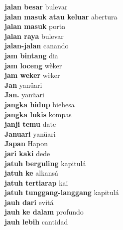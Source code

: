 \textbf{ jalan besar  } bulevar \\
\textbf{ jalan masuk atau keluar  } abertura \\
\textbf{ jalan masuk  } porta \\
\textbf{ jalan raya  } bulevar \\
\textbf{ jalan-jalan  } canando \\
\textbf{ jam bintang  } dia \\
\textbf{ jam loceng  } wèker \\
\textbf{ jam weker  } wèker \\
\textbf{ Jan  } yanüari \\
\textbf{ Jan.  } yanüari \\
\textbf{ jangka hidup  } biehesa \\
\textbf{ jangka lukis  } kompas \\
\textbf{ janji temu  } date \\
\textbf{ Januari  } yanüari \\
\textbf{ Japan  } Hapon \\
\textbf{ jari kaki  } dede \\
\textbf{ jatuh berguling  } kapitulá \\
\textbf{ jatuh ke  } alkansá \\
\textbf{ jatuh tertiarap  } kai \\
\textbf{ jatuh tunggang-langgang  } kapitulá \\
\textbf{ jauh dari  } evitá \\
\textbf{ jauh ke dalam  } profundo \\
\textbf{ jauh lebih  } cantidad \\
